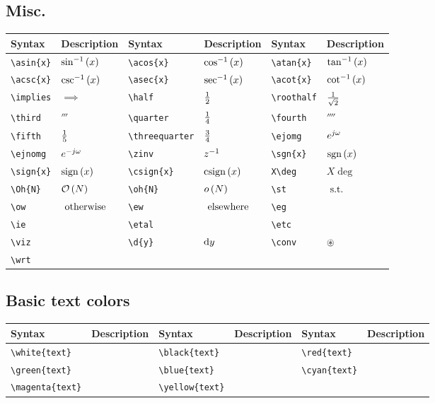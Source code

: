 \documentclass{article}
\begin{document}
	\subsection{Misc.}
	\begin{table}[H]
		\begin{tabular}{|l|l|l|l|l|l|}
			\hline
			Syntax	&	Description	&	Syntax	&	Description	&	Syntax	&	Description	 \\
			\hline
			\verb|\asin{x}|	&	$\sin^{-1}\left(x\right)$	&	\verb|\acos{x}|	&	$\cos^{-1}\left(x\right)$	&	\verb|\atan{x}|	&	$\tan^{-1}\left(x\right)$ \\	
			\verb|\acsc{x}|	&	$\csc^{-1}\left(x\right)$	&	\verb|\asec{x}|	&	$\sec^{-1}\left(x\right)$	&	\verb|\acot{x}|	&	$\cot^{-1}\left(x\right)$ \\
			\verb|\implies|	&	$\implies$	&	\verb|\half|	&	$\frac{1}{2}$	&	\verb|\roothalf|	&	$\frac{1}{\sqrt{2}}$ \\
			\verb|\third|	&	$\third$	&	\verb|\quarter|	&	$\frac{1}{4}$	&	\verb|\fourth|	&	$\fourth$ \\
			\verb|\fifth|	&	$\frac{1}{5}$	&	\verb|\threequarter|	&	$\frac{3}{4}$	&	\verb|\ejomg|	&	$e^{j\omega}$ \\
			\verb|\ejnomg|	&	$e^{-j\omega}$	&	\verb|\zinv|	&	$z^{-1}$	&	\verb|\sgn{x}|	&	$\mathrm{sgn}\left(x\right)$ \\
			\verb|\sign{x}|	&	$\mathrm{sign}\left(x\right)$	&	\verb|\csign{x}|	&	$\mathrm{csign}\left(x\right)$ & \verb|X\deg|	&	$X\deg$	\\			
			\verb|\Oh{N}|	&	$\mathcal{O}\left(N\right)$	&	\verb|\oh{N}|	&	$o\left(N\right)$	&	\verb|\st|	&	$~\mathrm{s.t.}~$ \\
			\verb|\ow|	&	$~\mathrm{otherwise}~$	&	\verb|\ew|	&	$~\mathrm{elsewhere}~$	&	\verb|\eg|	&	\eg \\
			\verb|\ie|	&	\ie	&	\verb|\etal|	&	\etal	&	\verb|\etc|	&	\etc \\
			\verb|\viz|	&	\viz & \verb|\d{y}|	&	$\mathrm{d}y$	&	\verb|\conv|	&	$\circledast$	\\
			\verb|\wrt|	&	\wrt & 	&		&		&		\\
			\hline	
		\end{tabular}
	\end{table}

	\subsection{Basic text colors}
	\begin{table}[H]
		\begin{tabular}{|l|l|l|l|l|l|}
			\hline
			Syntax	&	Description	&	Syntax	&	Description	&	Syntax	&	Description	 \\
			\hline
			\verb|\white{text}|	&	\white{text}	&	\verb|\black{text}|	&	\black{text}	&	\verb|\red{text}|	&	\red{text} \\	
			\verb|\green{text}|	&	\green{text}	&	\verb|\blue{text}|	&	\blue{text}	&	\verb|\cyan{text}|	&	\cyan{text} \\
			\verb|\magenta{text}|	&	\magenta{text}	&	\verb|\yellow{text}|	&	\yellow{text}	&		&	 \\
			\hline	
		\end{tabular}
	\end{table}
\end{document}
